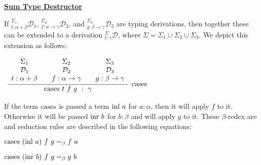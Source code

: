 \documentclass{book}
\begin{document}
    \begin{mdframed}

        \underline{{\bf Sum Type Destructor}}

        If $^{\Sigma_{1}}_{t : \alpha + \beta}\mathcal{D}_{1}$, $^{\Sigma_{2}}_{f : \alpha\rightarrow\gamma}\mathcal{D}_{2}$, and $^{\Sigma_{3}}_{g : \beta\rightarrow\gamma}\mathcal{D}_{3}$ are typing derivations, then together these can be extended to a derivation $^{\Sigma}_{t : \gamma}\mathcal{D}$, where $\Sigma = \Sigma_{1} \cup \Sigma_{2} \cup \Sigma_{3}$. We depict this extension as follows: 

        \begin{center}
            $\begin{array}{ c }
	
                \infer[\sumElim]{\sumElim \ t \ f \ g \ : \ \gamma}
                    {
                    \begin{array}{c} \Sigma_{1}  \\ \mathcal{D}_{1} \\ t : \alpha + \beta \end{array}
                     & 
                    \begin{array}{c} \Sigma_{2}  \\ \mathcal{D}_{2} \\ f : \alpha\rightarrow\gamma \end{array}				
                     & 
                    \begin{array}{c} \Sigma_{3}  \\ \mathcal{D}_{3} \\ g : \beta\rightarrow\gamma \end{array}				 
                    }	
            
            \end{array}$            
        \end{center}
    \end{mdframed}
    
    If the term $\text{cases}$ is passed a term $\text{inl} \ a$ for $a : \alpha$, then it will apply $f$ to it. Otherwise it will be passed $\inr \ b$ for $b : \beta$ and will apply $g$ to it. These $\beta$-redex are and reduction rules are described in the following equations: 

    \begin{center}
      $\text{cases} \ (\text{inl} \ a) \ f \ g =_{\beta} f \ a$ 
  
      $\text{cases} \ (\text{inr} \ b) \ f \ g =_{\beta} g \ b$
    \end{center}
\end{document}
